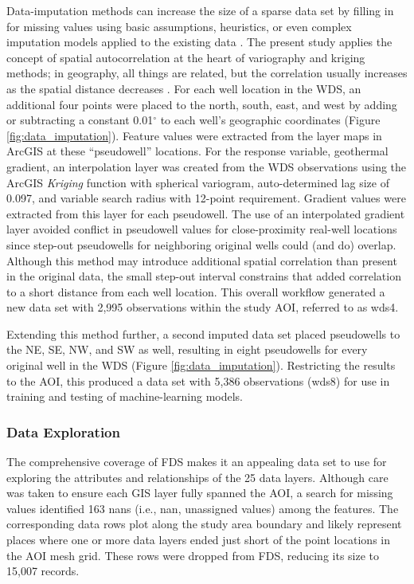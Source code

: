Data-imputation methods can increase the size of a sparse data set by filling in for missing values using basic assumptions, heuristics, or even complex imputation models applied to the existing data \citep[p.\ 332-333]{hastie_elements_2009}. The present study applies the concept of spatial autocorrelation at the heart of variography and kriging methods; in geography, all things are related, but the correlation usually increases as the spatial distance decreases \citep[Chapter\ 13]{gimond_intro_2021}. For each well location in the WDS, an additional four points were placed to the north, south, east, and west by adding or subtracting a constant 0.01$^\circ$ to each well’s geographic coordinates (Figure \ref{fig:data_imputation}). Feature values were extracted from the layer maps in ArcGIS at these ``pseudowell'' locations. For the response variable, geothermal gradient, an interpolation layer was created from the WDS observations using the ArcGIS \textit{Kriging} function with spherical variogram, auto-determined lag size of 0.097, and variable search radius with 12-point requirement. Gradient values were extracted from this layer for each pseudowell. The use of an interpolated gradient layer avoided conflict in pseudowell values for close-proximity real-well locations since step-out pseudowells for neighboring original wells could (and do) overlap. Although this method may introduce additional spatial correlation than present in the original data, the small step-out interval constrains that added correlation to a short distance from each well location. This overall workflow generated a new data set with 2,995 observations within the study AOI, referred to as \acrshort{wds4}. 

Extending this method further, a second imputed data set placed pseudowells to the NE, SE, NW, and SW as well, resulting in eight pseudowells for every original well in the WDS (Figure \ref{fig:data_imputation}). Restricting the results to the AOI, this produced a data set with 5,386 observations (\acrshort{wds8}) for use in training and testing of machine-learning models.

\subsubsection{Data Exploration}

The comprehensive coverage of FDS makes it an appealing data set to use for exploring the attributes and relationships of the 25 data layers. Although care was taken to ensure each GIS layer fully spanned the AOI, a search for missing values identified 163 \acrshort{nan}s (i.e., \acrlong{nan}, unassigned values) among the features. The corresponding data rows plot along the study area boundary and likely represent places where one or more data layers ended just short of the point locations in the AOI mesh grid. These rows were dropped from FDS, reducing its size to 15,007 records.

